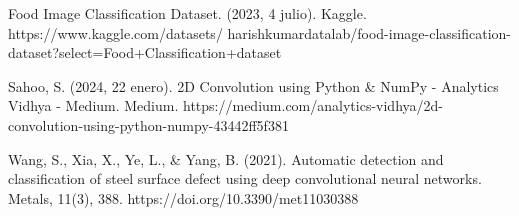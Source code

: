 \documentclass[twocolumn]{article}
\begin{document}
\begin{thebibliography}{9}
Food Image Classification Dataset. (2023, 4 julio). Kaggle. https://www.kaggle.com/datasets/
harishkumardatalab/food-image-classification-dataset?select=Food+Classification+dataset

Sahoo, S. (2024, 22 enero). 2D Convolution using Python \& NumPy - Analytics Vidhya - Medium. Medium. https://medium.com/analytics-vidhya/2d-convolution-using-python-numpy-43442ff5f381

Wang, S., Xia, X., Ye, L., \& Yang, B. (2021). Automatic detection and classification of steel surface defect using deep convolutional neural networks. Metals, 11(3), 388. https://doi.org/10.3390/met11030388

\end{thebibliography}
\end{document}
